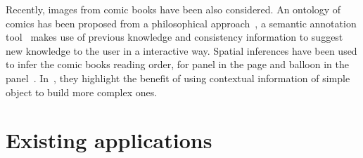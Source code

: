 
Recently, images from comic books have been also considered.
An ontology of comics has been proposed from a philosophical approach~\cite{Aaron2011}, a semantic annotation tool~\cite{Hermann2012Guided} makes use of previous knowledge and consistency information to suggest new knowledge to the user in a interactive way.
Spatial inferences have been used to infer the comic books reading order, for panel in the page and balloon in the panel~\cite{Guerin2012Ontologies}. 
In~\cite{Sciascio2011Structured}, they highlight the benefit of using contextual information of simple object to build more complex ones.


\section{Existing applications}
\label{sec:sota:applications}





